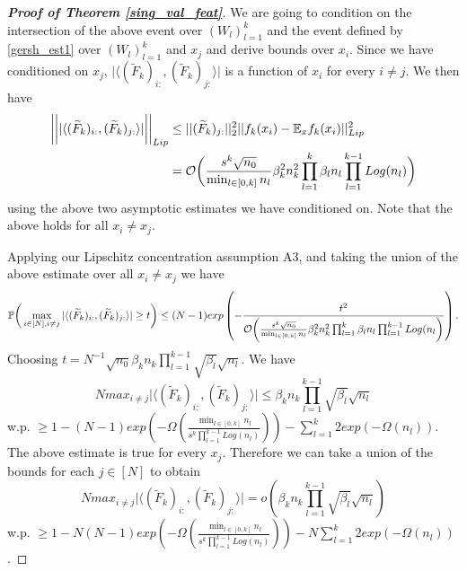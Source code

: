 \documentclass{article}
\theoremstyle{plain}
\theoremstyle{definition}
\theoremstyle{remark}
\begin{document}
\begin{proof}[\textbf{Proof of Theorem \ref{sing_val_feat}}]
We are going to condition on the intersection of the above event over 
$(W_l)_{l=1}^k$ and the event defined by \eqref{gersh_est1} over 
$(W_l)_{l=1}^k$ and $x_j$ and derive bounds over $x_i$. 
Since we have conditioned on $x_j$, 
$\vert\langle (\widetilde{F}_k)_{i:}, (\widetilde{F}_k)_{j:}
\rangle\vert$ is a function of $x_i$ for every $i \neq j$. We then have
\begin{align*}
\bigg{\vert}\bigg{\vert} \vert\langle (\widetilde{F}_k)_{i:}, (\widetilde{F}_k)_{j:}
\rangle\vert 
\bigg{\vert}\bigg{\vert}_{Lip} &\leq 
\vert\vert (\widetilde{F}_k)_{j:}\vert\vert^2_2
\vert\vert f_k(x_i) - \mathbb{E}_{x}f_k(x_i)\vert\vert^2_{Lip} \\
&=
\mathcal{O}\bigg{(}
\frac{s^k\sqrt{n_0}}{\min_{l \in [0,k]}n_l}\beta_k^2n_k^2\prod_{l=1}^k
\beta_ln_l\prod_{l=1}^{k-1}Log(n_l)
\bigg{)}
\end{align*}
using the above two asymptotic estimates we have conditioned on. Note that the above holds for all $x_i \neq x_j$.

Applying our Lipschitz concentration assumption A3, and taking the union of the above estimate over all $x_i \neq x_j$ we have
\begin{equation*}
\mathbb{P}\bigg{(}
\max_{i \in [N], i\neq j}
\vert\langle (\widetilde{F}_k)_{i:}, (\widetilde{F}_k)_{j:}
\rangle\vert \geq t
\bigg{)}
\leq
(N-1)exp\left(
-\frac{t^2}{\mathcal{O}
\bigg{(}
\frac{s^k\sqrt{n_0}}{\min_{l \in [0,k]}n_l}\beta_k^2n_k^2\prod_{l=1}^k
\beta_ln_l\prod_{l=1}^{k-1}Log(n_l
\bigg{)}
}
\right).
\end{equation*}
Choosing $t = N^{-1}\sqrt{n_0}\beta_kn_k\prod_{l=1}^{k-1}\sqrt{\beta_l}
\sqrt{n_l}$. We have
\begin{equation*}
	Nmax_{i\neq j}\vert\langle (\widetilde{F}_k)_{i:}, (\widetilde{F}_k)_{j:}
\rangle\vert \leq 
\beta_kn_k\prod_{l=1}^{k-1}\sqrt{\beta_l}\sqrt{n_l}
\end{equation*}
w.p. $\geq 1 - (N-1)exp\left(-
\Omega\left(
\frac{\min_{l \in [0,k]}n_l}{s^k\prod_{l=1}^{k-1}Log(n_l)}
\right)
\right) - \sum_{l=1}^k2exp(-\Omega(n_l))$.
The above estimate is true for every $x_j$. Therefore we can take a union of the bounds for each $j \in [N]$ to obtain
\begin{equation*}
	Nmax_{i\neq j}\vert\langle (\widetilde{F}_k)_{i:}, (\widetilde{F}_k)_{j:}
\rangle\vert = 
o\left(
\beta_kn_k\prod_{l=1}^{k-1}\sqrt{\beta_l}\sqrt{n_l}
\right)
\end{equation*}
w.p. $\geq 1 - N(N-1)exp\left(-
\Omega\left(
\frac{\min_{l \in [0,k]}n_l}{s^k\prod_{l=1}^{k-1}Log(n_l)}
\right)
\right) - N\sum_{l=1}^k2exp(-\Omega(n_l))$.


\end{proof}
\end{document}
